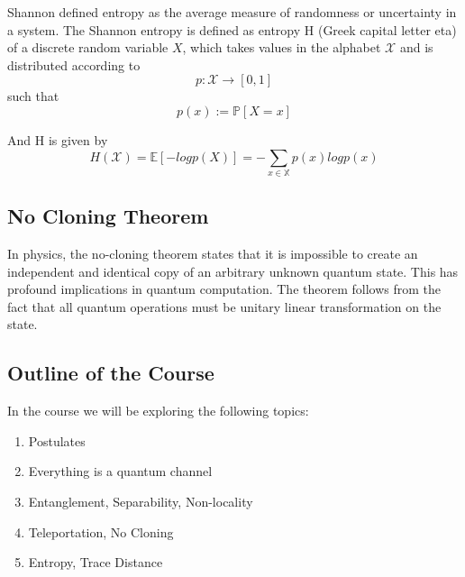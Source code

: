 \documentclass{article}
\begin{document}
            Shannon defined entropy as the average measure of randomness or uncertainty in a system. The Shannon entropy 
            is defined as entropy H (Greek capital letter eta) of a discrete random variable $X$, which takes values in the alphabet $\mathcal{X}$ and is distributed according to \\
            
            $$p : \mathcal{X} \longrightarrow [0,1]$$ such that $$p(x) := \mathbb{P}[X = x]$$

            And H is given by \\
            $$H(\mathcal{X}) = \mathbb{E}[-logp(X)] = -\sum_{x \in \mathbb{X}}p(x)logp(x)$$
            

        \subsection{No Cloning Theorem}

            In physics, the no-cloning theorem states that it is impossible to create an independent and identical copy of an arbitrary unknown quantum state. This has profound implications in quantum computation. The theorem follows from the fact that all quantum operations must be unitary linear transformation on the state.

        \subsection{Outline of the Course}
            In the course we will be exploring the following topics:
            
            \begin{enumerate}
                \item Postulates
                \item Everything is a quantum channel
                \item Entanglement, Separability, Non-locality
                \item Teleportation, No Cloning
                \item Entropy, Trace Distance
            \end{enumerate}
\end{document}
